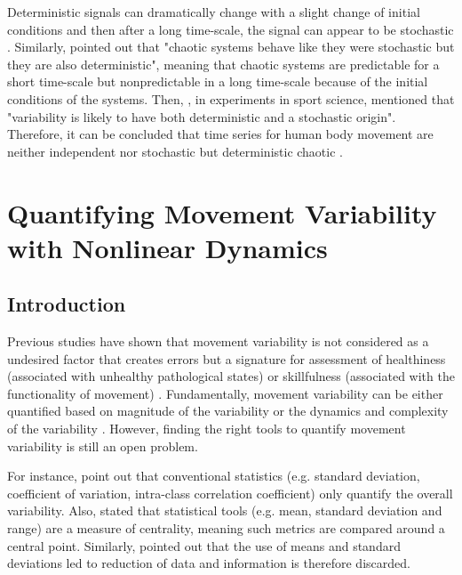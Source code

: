 Deterministic signals can dramatically change with a slight change 
of initial conditions and then after a long time-scale, the signal can 
appear to be stochastic \citep{amato1992}. Similarly, 
\citealt[p. 11]{klonowski2007} pointed out that "chaotic systems behave 
like they were stochastic but they are also deterministic", meaning that 
chaotic systems are predictable for a short time-scale but nonpredictable 
in a long time-scale because of the initial conditions of the systems. 
Then, \citealt[p. 78]{preatoni2013}, in experiments in sport science, mentioned 
that "variability is likely to have both deterministic and a 
stochastic origin". Therefore, it can be concluded that time series for 
human body movement are neither independent nor stochastic but 
deterministic chaotic \citep{stergiou2006, harbourne2009, stergiou2011}.


\section{Quantifying Movement Variability with Nonlinear Dynamics}


\subsection{Introduction}
Previous studies have shown that movement variability is not considered 
as a undesired factor that creates errors but a signature for 
assessment of healthiness (associated with unhealthy pathological states) 
or skillfulness (associated with the functionality of movement) 
\citep{stergiou2011}. Fundamentally, movement variability can be either 
quantified based on magnitude of the variability or the dynamics and 
complexity of the variability \citep{caballero2014}. However, finding 
the right tools to quantify movement variability is still an open problem. 

For instance, \cite{preatoni2010, preatoni2013} point
out that conventional statistics (e.g. standard deviation, coefficient 
of variation, intra-class correlation coefficient) only quantify 
the overall variability.
Also, \cite{stergiou2011} stated that statistical tools 
(e.g. mean, standard deviation and range) are a measure of centrality,
meaning such metrics are compared around a central point. Similarly, 
\cite{coffey2011} pointed out that the use of means and standard deviations 
led to reduction of data and information is therefore discarded.

